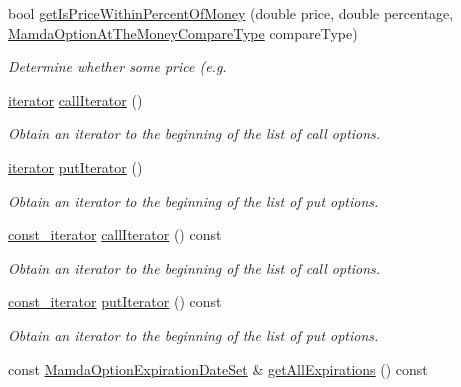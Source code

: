 \begin{CompactItemize}
bool \hyperlink{classWombat_1_1MamdaOptionChain_f9a271be645a3afdba8e3a7d13d824ab}{get\-Is\-Price\-Within\-Percent\-Of\-Money} (double price, double percentage, \hyperlink{namespaceWombat_a07b06a78fb02e1f93ee37a2d944c33a}{Mamda\-Option\-At\-The\-Money\-Compare\-Type} compare\-Type)
\begin{CompactList}\small\item\em Determine whether some price (e.g. \item\end{CompactList}\item 
\hyperlink{classWombat_1_1MamdaOptionChain_1_1iterator}{iterator} \hyperlink{classWombat_1_1MamdaOptionChain_67f773d9967e44398ea03cd44f0fcc48}{call\-Iterator} ()
\begin{CompactList}\small\item\em Obtain an iterator to the beginning of the list of call options. \item\end{CompactList}\item 
\hyperlink{classWombat_1_1MamdaOptionChain_1_1iterator}{iterator} \hyperlink{classWombat_1_1MamdaOptionChain_9e94ee48221e0be5f47c33e9d5065345}{put\-Iterator} ()
\begin{CompactList}\small\item\em Obtain an iterator to the beginning of the list of put options. \item\end{CompactList}\item 
\hyperlink{classWombat_1_1MamdaOptionChain_1_1const__iterator}{const\_\-iterator} \hyperlink{classWombat_1_1MamdaOptionChain_ad8f3535caee91bda7f8165da6ffc36d}{call\-Iterator} () const 
\begin{CompactList}\small\item\em Obtain an iterator to the beginning of the list of call options. \item\end{CompactList}\item 
\hyperlink{classWombat_1_1MamdaOptionChain_1_1const__iterator}{const\_\-iterator} \hyperlink{classWombat_1_1MamdaOptionChain_051522c5af2231be1771c9482a017e84}{put\-Iterator} () const 
\begin{CompactList}\small\item\em Obtain an iterator to the beginning of the list of put options. \item\end{CompactList}\item 
const \hyperlink{classWombat_1_1MamdaOptionExpirationDateSet}{Mamda\-Option\-Expiration\-Date\-Set} \& \hyperlink{classWombat_1_1MamdaOptionChain_f55c38897392baaea74b1f2905d3e026}{get\-All\-Expirations} () const 

\end{CompactItemize}
